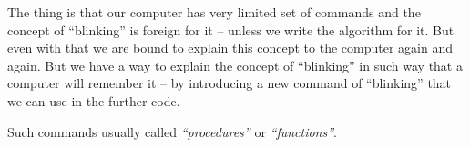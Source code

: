\documentclass[../sparc.tex]{subfiles}
\begin{document}
The thing is that our computer has very limited set of commands and the concept
of ``blinking'' is foreign for it -- unless we write the algorithm for it.  But
even with that we are bound to explain this concept to the computer again and
again.  But we have a way to explain the concept of ``blinking'' in such way
that a computer will remember it -- by introducing a new command of ``blinking''
that we can use in the further code.

Such commands usually called \emph{``procedures''} or \emph{``functions''}.
\end{document}
